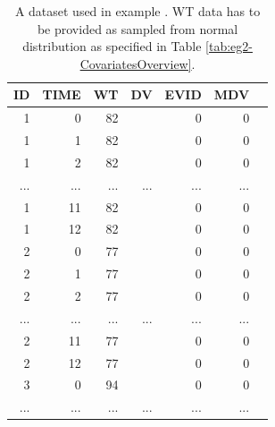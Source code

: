 \begin{table}[htdp]
\begin{center}
\small
\renewcommand{\arraystretch}{1.1}%
\begin{tabular}{rrrrrrr}\toprule
ID	& TIME 	& WT	& DV		& EVID	& MDV \\\midrule
1	& 0		& 82		& 		& 0		& 0	\\
1	& 1		& 82		& 		& 0		& 0	\\
1	& 2		& 82		& 		& 0		& 0	\\
...	& ...		& ...		& ...		& ...		& ...	\\
1	& 11		& 82		& 		& 0		& 0	\\
1	& 12		& 82		& 		& 0		& 0	\\
2	& 0		& 77		& 		& 0		& 0	\\
2	& 1		& 77		& 		& 0		& 0	\\
2	& 2		& 77		& 		& 0		& 0	\\
...	& ...		& ...		& ...		& ...		& ...	\\
2	& 11		& 77		& 		& 0		& 0	\\
2	& 12		& 77		& 		& 0		& 0	\\
3	& 0		& 94		& 		& 0		& 0	\\
...	& ...		& ...		&...		& ...		& ...	\\ \bottomrule
\end{tabular}
\end{center}
\caption{A dataset used in example \theexamples. WT data has to be provided 
as sampled from normal distribution as specified in Table \ref{tab:eg2-CovariatesOverview}.}
\label{tab:example2_dataSet}
\end{table}%
\lstset{language=XML}
